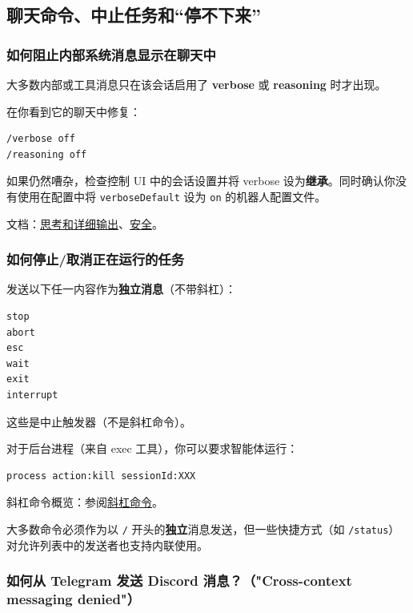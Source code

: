 \subsection{聊天命令、中止任务和“停不下来”}


\subsubsection{如何阻止内部系统消息显示在聊天中}


大多数内部或工具消息只在该会话启用了 \textbf{verbose} 或 \textbf{reasoning} 时才出现。

在你看到它的聊天中修复：

\begin{lstlisting}
/verbose off
/reasoning off
\end{lstlisting}


如果仍然嘈杂，检查控制 UI 中的会话设置并将 verbose 设为\textbf{继承}。同时确认你没有使用在配置中将 \texttt{verboseDefault} 设为 \texttt{on} 的机器人配置文件。

文档：\href{/tools/thinking}{思考和详细输出}、\href{/gateway/security\#reasoning--verbose-output-in-groups}{安全}。

\subsubsection{如何停止/取消正在运行的任务}


发送以下任一内容作为\textbf{独立消息}（不带斜杠）：

\begin{lstlisting}
stop
abort
esc
wait
exit
interrupt
\end{lstlisting}


这些是中止触发器（不是斜杠命令）。

对于后台进程（来自 exec 工具），你可以要求智能体运行：

\begin{lstlisting}
process action:kill sessionId:XXX
\end{lstlisting}


斜杠命令概览：参阅\href{/tools/slash-commands}{斜杠命令}。

大多数命令必须作为以 \texttt{/} 开头的\textbf{独立}消息发送，但一些快捷方式（如 \texttt{/status}）对允许列表中的发送者也支持内联使用。

\subsubsection{如何从 Telegram 发送 Discord 消息？（"Cross-context messaging denied"）}


